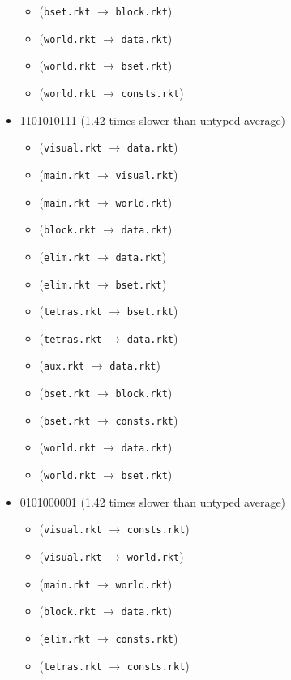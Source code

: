 \documentclass{article}
\newcommand{\mono}[1]{\texttt{#1}}
\begin{document}
\begin{itemize}
\begin{itemize}
  \item (\mono{bset.rkt} $\rightarrow$ \mono{block.rkt})
  \item (\mono{world.rkt} $\rightarrow$ \mono{data.rkt})
  \item (\mono{world.rkt} $\rightarrow$ \mono{bset.rkt})
  \item (\mono{world.rkt} $\rightarrow$ \mono{consts.rkt})
  \end{itemize}
\item 1101010111 (1.42 times slower than untyped average)
  \begin{itemize}
  \item (\mono{visual.rkt} $\rightarrow$ \mono{data.rkt})
  \item (\mono{main.rkt} $\rightarrow$ \mono{visual.rkt})
  \item (\mono{main.rkt} $\rightarrow$ \mono{world.rkt})
  \item (\mono{block.rkt} $\rightarrow$ \mono{data.rkt})
  \item (\mono{elim.rkt} $\rightarrow$ \mono{data.rkt})
  \item (\mono{elim.rkt} $\rightarrow$ \mono{bset.rkt})
  \item (\mono{tetras.rkt} $\rightarrow$ \mono{bset.rkt})
  \item (\mono{tetras.rkt} $\rightarrow$ \mono{data.rkt})
  \item (\mono{aux.rkt} $\rightarrow$ \mono{data.rkt})
  \item (\mono{bset.rkt} $\rightarrow$ \mono{block.rkt})
  \item (\mono{bset.rkt} $\rightarrow$ \mono{consts.rkt})
  \item (\mono{world.rkt} $\rightarrow$ \mono{data.rkt})
  \item (\mono{world.rkt} $\rightarrow$ \mono{bset.rkt})
  \end{itemize}
\item 0101000001 (1.42 times slower than untyped average)
  \begin{itemize}
  \item (\mono{visual.rkt} $\rightarrow$ \mono{consts.rkt})
  \item (\mono{visual.rkt} $\rightarrow$ \mono{world.rkt})
  \item (\mono{main.rkt} $\rightarrow$ \mono{world.rkt})
  \item (\mono{block.rkt} $\rightarrow$ \mono{data.rkt})
  \item (\mono{elim.rkt} $\rightarrow$ \mono{consts.rkt})
  \item (\mono{tetras.rkt} $\rightarrow$ \mono{consts.rkt})

\end{itemize}
\end{itemize}
\end{document}
